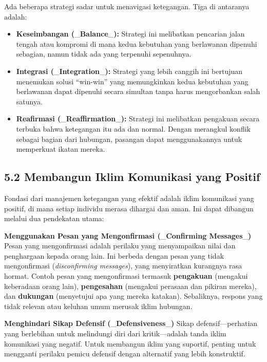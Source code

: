 \documentclass[
  letterpaper,
  DIV=11,
  numbers=noendperiod]{scrreprt}
\providecommand{\tightlist}{%
  \setlength{\itemsep}{0pt}\setlength{\parskip}{0pt}}
\begin{document}
Ada beberapa strategi sadar untuk menavigasi ketegangan. Tiga di
antaranya adalah:

\begin{itemize}
\tightlist
\item
  \textbf{Keseimbangan (}\_\textbf{Balance}\_\textbf{):} Strategi ini
  melibatkan pencarian jalan tengah atau kompromi di mana kedua
  kebutuhan yang berlawanan dipenuhi sebagian, namun tidak ada yang
  terpenuhi sepenuhnya.
\item
  \textbf{Integrasi (}\_\textbf{Integration}\_\textbf{):} Strategi yang
  lebih canggih ini bertujuan menemukan solusi ``win-win'' yang
  memungkinkan kedua kebutuhan yang berlawanan dapat dipenuhi secara
  simultan tanpa harus mengorbankan salah satunya.
\item
  \textbf{Reafirmasi (}\_\textbf{Reaffirmation}\_\textbf{):} Strategi
  ini melibatkan pengakuan secara terbuka bahwa ketegangan itu ada dan
  normal. Dengan merangkul konflik sebagai bagian dari hubungan,
  pasangan dapat menggunakannya untuk memperkuat ikatan mereka.
\end{itemize}

\subsection{\texorpdfstring{\textbf{5.2 Membangun Iklim Komunikasi yang
Positif}}{5.2 Membangun Iklim Komunikasi yang Positif}}\label{membangun-iklim-komunikasi-yang-positif}

Fondasi dari manajemen ketegangan yang efektif adalah iklim komunikasi
yang positif, di mana setiap individu merasa dihargai dan aman. Ini
dapat dibangun melalui dua pendekatan utama:

\textbf{Menggunakan Pesan yang Mengonfirmasi (}\_\textbf{Confirming
Messages}\_\textbf{)} Pesan yang mengonfirmasi adalah perilaku yang
menyampaikan nilai dan penghargaan kepada orang lain. Ini berbeda dengan
pesan yang tidak mengonfirmasi (\emph{disconfirming messages}), yang
menyiratkan kurangnya rasa hormat. Contoh pesan yang mengonfirmasi
termasuk \textbf{pengakuan} (mengakui keberadaan orang lain),
\textbf{pengesahan} (mengakui perasaan dan pikiran mereka), dan
\textbf{dukungan} (menyetujui apa yang mereka katakan). Sebaliknya,
respons yang tidak relevan atau keluhan umum merusak iklim hubungan.

\textbf{Menghindari Sikap Defensif
(}\_\textbf{Defensiveness}\_\textbf{)} Sikap defensif---perhatian yang
berlebihan untuk melindungi diri dari kritik---adalah tanda iklim
komunikasi yang negatif. Untuk membangun iklim yang suportif, penting
untuk mengganti perilaku pemicu defensif dengan alternatif yang lebih
konstruktif.
\end{document}
